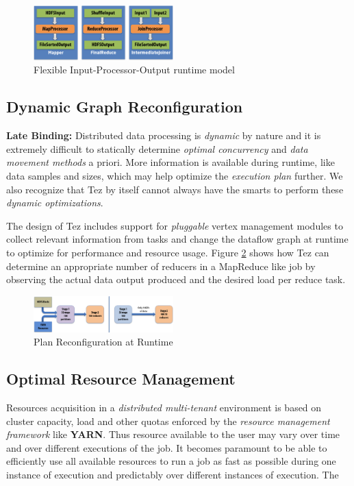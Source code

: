 \documentclass[twocolumn]{article}
\begin{document}
\begin{figure}[htb]
        \centering
        \includegraphics[width=0.48\textwidth]{tez2}
        \caption{Flexible Input-Processor-Output runtime model}
        \label{fig04}
\end{figure}

\subsection{Dynamic Graph Reconfiguration}

\textbf{Late Binding:} Distributed data processing is \emph{dynamic} by nature and it is
extremely difficult to statically determine \emph{optimal concurrency}
and \emph{data movement methods} a priori. More information is available
during runtime, like data samples and sizes, which may help optimize the
\emph{execution plan} further. We also recognize that Tez by itself
cannot always have the smarts to perform these \emph{dynamic
optimizations}. 

The design of Tez includes support for \textit{pluggable} vertex
management modules to collect relevant information from tasks and change
the dataflow graph at runtime to optimize for performance and resource
usage. Figure \ref{fig05} shows how Tez can determine an appropriate number of
reducers in a MapReduce like job by observing the actual data output
produced and the desired load per reduce task.

\begin{figure}[htb]
        \centering
        \includegraphics[width=0.48\textwidth]{tez3}
        \caption{Plan Reconfiguration at Runtime}
        \label{fig05}
\end{figure}

\subsection{Optimal Resource Management}

Resources acquisition in a \emph{distributed multi-tenant} environment
is based on cluster capacity, load and other quotas enforced by the
\emph{resource management framework} like \textbf{YARN}. Thus resource
available to the user may vary over time and over different executions
of the job. It becomes paramount to be able to efficiently use all
available resources to run a job as fast as possible during one instance
of execution and predictably over different instances of execution. The
\end{document}

